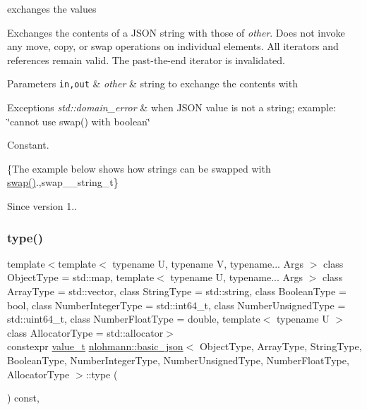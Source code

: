 exchanges the values 

Exchanges the contents of a J\+S\+ON string with those of {\itshape other}. Does not invoke any move, copy, or swap operations on individual elements. All iterators and references remain valid. The past-\/the-\/end iterator is invalidated.


\begin{DoxyParams}[1]{Parameters}
\mbox{\tt in,out}  & {\em other} & string to exchange the contents with\\
\hline
\end{DoxyParams}

\begin{DoxyExceptions}{Exceptions}
{\em std\+::domain\+\_\+error} & when J\+S\+ON value is not a string; example\+: {\ttfamily \char`\"{}cannot
use swap() with boolean\char`\"{}}\\
\hline
\end{DoxyExceptions}
Constant.

\{The example below shows how strings can be swapped with {\ttfamily \hyperlink{classnlohmann_1_1basic__json_a2f774129440c427253dc97406e2d9010}{swap()}}.,swap\+\_\+\+\_\+string\+\_\+t\}

\begin{DoxySince}{Since}
version 1.. 
\end{DoxySince}
\hypertarget{classnlohmann_1_1basic__json_a5d466b240d0ba9f648d7fd4ff42359f5}{}\label{classnlohmann_1_1basic__json_a5d466b240d0ba9f648d7fd4ff42359f5} 
\subsubsection{\texorpdfstring{type()}{type()}}
{\footnotesize\ttfamily template$<$template$<$ typename U, typename V, typename... Args $>$ class Object\+Type = std\+::map, template$<$ typename U, typename... Args $>$ class Array\+Type = std\+::vector, class String\+Type  = std\+::string, class Boolean\+Type  = bool, class Number\+Integer\+Type  = std\+::int64\+\_\+t, class Number\+Unsigned\+Type  = std\+::uint64\+\_\+t, class Number\+Float\+Type  = double, template$<$ typename U $>$ class Allocator\+Type = std\+::allocator$>$ \\
constexpr \hyperlink{classnlohmann_1_1basic__json_a231b02148577b69a154b2ce2c87a5522}{value\+\_\+t} \hyperlink{classnlohmann_1_1basic__json}{nlohmann\+::basic\+\_\+json}$<$ Object\+Type, Array\+Type, String\+Type, Boolean\+Type, Number\+Integer\+Type, Number\+Unsigned\+Type, Number\+Float\+Type, Allocator\+Type $>$\+::type (\begin{DoxyParamCaption}{ }\end{DoxyParamCaption}) const\hspace{0.3cm}{\ttfamily [inline]}, {\ttfamily [noexcept]}}



